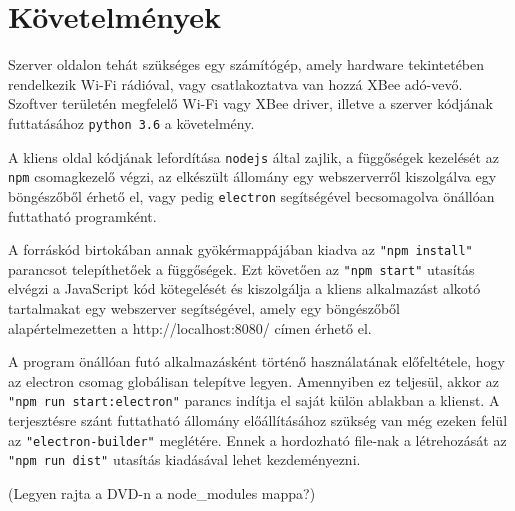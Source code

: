 \section{Követelmények}

Szerver oldalon tehát szükséges egy számítógép, amely hardware tekintetében
rendelkezik Wi-Fi rádióval, vagy csatlakoztatva van hozzá XBee adó-vevő.
Szoftver területén megfelelő Wi-Fi vagy XBee driver, illetve a szerver
kódjának futtatásához \verb|python 3.6| a követelmény.

A kliens oldal kódjának lefordítása \verb|nodejs| által zajlik, a függőségek
kezelését az \verb|npm| csomagkezelő végzi, az elkészült állomány egy
webszerverről kiszolgálva egy böngészőből érhető el, vagy pedig \verb|electron|
segítségével becsomagolva önállóan futtatható programként.

A forráskód birtokában annak gyökérmappájában kiadva az \verb|"npm install"|
parancsot telepíthetőek a függőségek. Ezt követően az \verb|"npm start"|
utasítás elvégzi a JavaScript kód kötegelését és kiszolgálja a kliens
alkalmazást alkotó tartalmakat egy webszerver segítségével, amely egy
böngészőből alapértelmezetten a http://localhost:8080/ címen érhető el.

A program önállóan futó alkalmazásként történő használatának előfeltétele, hogy
az electron csomag globálisan telepítve legyen. Amennyiben ez teljesül, akkor az
\verb|"npm run start:electron"| parancs indítja el saját külön ablakban a
klienst. A terjesztésre szánt futtatható állomány előállításához szükség van még
ezeken felül az \verb|"electron-builder"| meglétére. Ennek a hordozható file-nak
a létrehozását az \verb|"npm run dist"| utasítás kiadásával lehet kezdeményezni.

(Legyen rajta a DVD-n a node\_modules mappa?)
